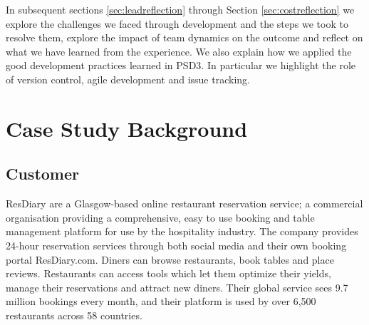\documentclass{l3proj}
\begin{document}
In subsequent sections \ref{sec:leadreflection} through Section \ref{sec:costreflection} we explore the challenges we faced through development and the steps we took to resolve them, explore the impact of team dynamics on the outcome and reflect on what we have learned from the experience. We also explain how we applied the good development practices learned in PSD3. In particular we highlight the role of version control, agile development and issue tracking.

\newpage


\section{Case Study Background}
\label{sec:background}

\subsection{Customer}
\label{sec:customer}



ResDiary are a Glasgow-based online restaurant reservation service; a commercial organisation providing a comprehensive, easy to use booking and table management platform for use by the hospitality industry. The company provides 24-hour reservation services through both social media and their own booking portal ResDiary.com. Diners can browse restaurants, book tables and place reviews. Restaurants can access tools which let them optimize their yields, manage their reservations and attract new diners. Their global service sees 9.7 million bookings every month, and their platform is used by over 6,500 restaurants across 58 countries. 
\end{document}
